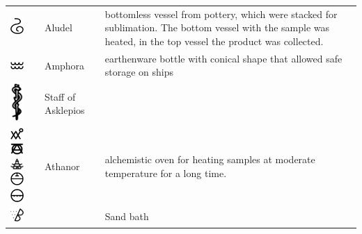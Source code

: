\documentclass[british,final,landscape]{scrartcl}
\begin{document}
\begin{refsection}
\begin{supertabular}{p{0.3\textwidth}p{0.34\textwidth}p{0.34\textwidth}}
   \includegraphics[width=5mm]{Tools/Aludel} & Aludel & bottomless vessel from pottery, which were stacked for sublimation. The bottom vessel with the sample was heated, in the top vessel the product was collected.\\
   \includegraphics[width=5mm]{Tools/Amphora} & Amphora & earthenware bottle with conical shape that allowed safe storage on ships\\
   \includegraphics[width=5mm]{Tools/Asklepios} & Staff of Asklepios & \\
   \includegraphics[width=5mm]{Tools/Athanor1} \includegraphics[width=5mm]{Tools/Athanor2} \includegraphics[width=5mm]{Tools/Athanor3} \includegraphics[width=5mm]{Tools/Athanor4} \includegraphics[width=5mm]{Tools/Athanor5} & Athanor & alchemistic oven for heating samples at moderate temperature for a long time.\\
   \includegraphics[width=5mm]{Tools/BainArenae} &  & Sand bath \\

\end{supertabular}
\end{refsection}
\end{document}
